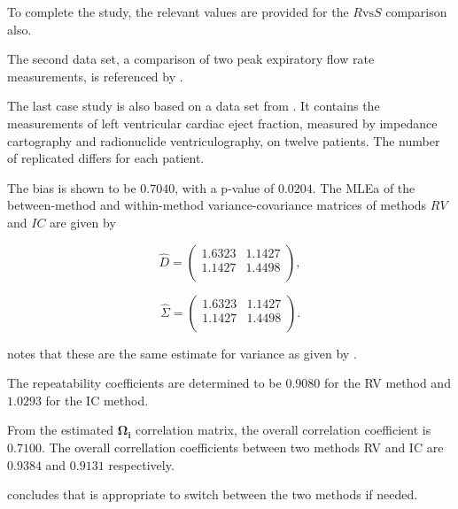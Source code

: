 \documentclass[12pt, a4paper]{report}
\theoremstyle{plain}
\theoremstyle{definition}
\theoremstyle{remark}
\begin{document}
	To complete the study, the relevant values are provided for the $R \mbox{vs} S$ comparison also.
	
	
	The second data set, a comparison of two peak expiratory flow rate measurements, is referenced by \citet{BA86}.
	
	
	The last case study is also based on a data set from  \citet{BA99}. It contains the measurements of left ventricular cardiac eject fraction, measured by impedance cartography and radionuclide ventriculography, on twelve patients.
	The number of replicated differs for each patient.
	
	The bias is shown to be $0.7040$, with a p-value of $0.0204$. The MLEa of the between-method and within-method variance-covariance matrices of methods $RV$ and $IC$ are given by
	
	\begin{equation}\hat{D}=\left(
	\begin{array}{cc}
	1.6323 & 1.1427 \\
	1.1427 & 1.4498 \\
	\end{array}
	\right),
	\end{equation}
	
	
	
	\begin{equation}\hat{\Sigma}=\left(
	\begin{array}{cc}
	1.6323 & 1.1427 \\
	1.1427 & 1.4498 \\
	\end{array}
	\right).
	\end{equation}
	
	\citet{ARoy2009} notes that these are the same estimate for variance as given by \citet{BA99}.
	
	
	The repeatability coefficients are determined to be $0.9080$ for the RV method and $1.0293$ for the IC method.
	
	From the estimated $\boldsymbol{\Omega_{i}}$ correlation matrix, the overall correlation coefficient is $0.7100$.
	The overall correllation coefficients between two methods RV and IC are $0.9384$ and $0.9131$ respectively.
	
	\citet{ARoy2009} concludes that is appropriate to switch between the two methods if needed.
	
\end{document}

